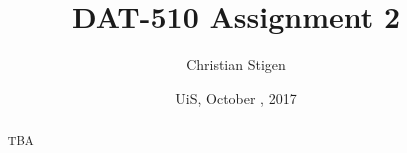 \documentclass[a4paper,english,12pt]{article}
\title{DAT-510 Assignment 2}
\author{Christian Stigen}
\date{UiS, October \nth{9}, 2017}
\begin{document}
\maketitle

\begin{abstract}
  TBA
\end{abstract}

\cite{test}



\end{document}
